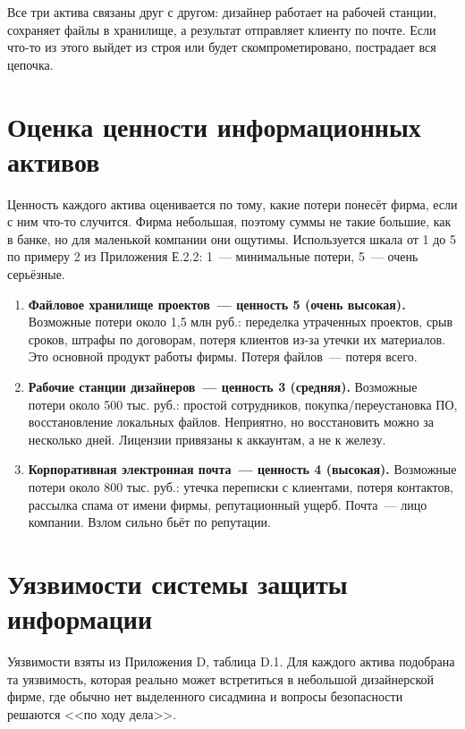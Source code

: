 \documentclass[a4paper,14pt]{extarticle}
\begin{document}
Все три актива связаны друг с другом: дизайнер работает на рабочей станции, сохраняет файлы в хранилище, а результат отправляет клиенту по почте. Если что-то из этого выйдет из строя или будет скомпрометировано, пострадает вся цепочка.

\section{Оценка ценности информационных активов}

Ценность каждого актива оценивается по тому, какие потери понесёт фирма, если с ним что-то случится. Фирма небольшая, поэтому суммы не такие большие, как в банке, но для маленькой компании они ощутимы. Используется шкала от 1 до 5 по примеру 2 из Приложения Е.2.2: 1~--- минимальные потери, 5~--- очень серьёзные.

\begin{enumerate}[label=\textbf{\arabic*.}]
\item \textbf{Файловое хранилище проектов~--- ценность 5 (очень высокая).} Возможные потери около 1,5 млн руб.: переделка утраченных проектов, срыв сроков, штрафы по договорам, потеря клиентов из-за утечки их материалов. Это основной продукт работы фирмы. Потеря файлов~--- потеря всего.

\item \textbf{Рабочие станции дизайнеров~--- ценность 3 (средняя).} Возможные потери около 500 тыс. руб.: простой сотрудников, покупка/переустановка ПО, восстановление локальных файлов. Неприятно, но восстановить можно за несколько дней. Лицензии привязаны к аккаунтам, а не к железу.

\item \textbf{Корпоративная электронная почта~--- ценность 4 (высокая).} Возможные потери около 800 тыс. руб.: утечка переписки с клиентами, потеря контактов, рассылка спама от имени фирмы, репутационный ущерб. Почта~--- лицо компании. Взлом сильно бьёт по репутации.
\end{enumerate}

\section{Уязвимости системы защиты информации}

Уязвимости взяты из Приложения D, таблица D.1. Для каждого актива подобрана та уязвимость, которая реально может встретиться в небольшой дизайнерской фирме, где обычно нет выделенного сисадмина и вопросы безопасности решаются <<по ходу дела>>.
\end{document}
